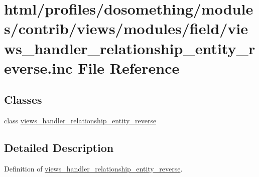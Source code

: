 \hypertarget{views__handler__relationship__entity__reverse_8inc}{
\section{html/profiles/dosomething/modules/contrib/views/modules/field/views\_\-handler\_\-relationship\_\-entity\_\-reverse.inc File Reference}
\label{views__handler__relationship__entity__reverse_8inc}
}
\subsection*{Classes}
\begin{DoxyCompactItemize}
\item 
class \hyperlink{classviews__handler__relationship__entity__reverse}{views\_\-handler\_\-relationship\_\-entity\_\-reverse}
\end{DoxyCompactItemize}


\subsection{Detailed Description}
Definition of \hyperlink{classviews__handler__relationship__entity__reverse}{views\_\-handler\_\-relationship\_\-entity\_\-reverse}. 